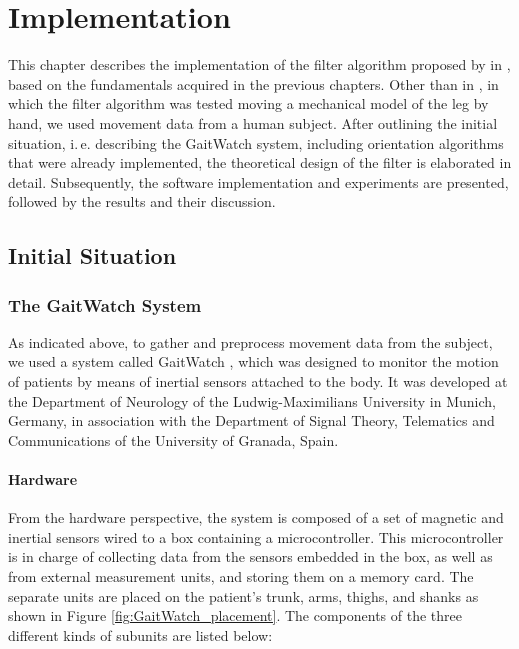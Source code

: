 \chapter{Implementation}
\label{ch:Implementation}

This chapter describes the implementation of the filter algorithm proposed by \citeauthor{bennett_motion_2014} in \cite{bennett_motion_2014}, based on the fundamentals acquired in the previous chapters. Other than in \cite{bennett_motion_2014}, in which the filter algorithm was tested moving a mechanical model of the leg by hand, we used movement data from a human subject. After outlining the initial situation, i.\,e. \mbox{describing} the GaitWatch system, including orientation algorithms that were already implemented, the theoretical design of the filter is elaborated in detail. Subsequently, the software implementation and experiments are presented, followed by the results and their discussion.

\section{Initial Situation}\label{sec:initial_situation}

\subsection{The GaitWatch System}

As indicated above, to gather and preprocess movement data from the subject, we used a system called GaitWatch \cite{olivares_vicente_gaitwatch_2013}, which was designed to monitor the motion of patients by means of inertial sensors attached to the body. It was developed at the Department of Neurology of the Ludwig-Maximilians University in Munich, Germany, in association with the Department of Signal Theory, Telematics and Communications of the University of Granada, Spain.

\subsubsection{Hardware}

From the hardware perspective, the system is composed of a set of magnetic and inertial sensors wired to a box containing a microcontroller. This microcontroller is in charge of collecting data from the sensors embedded in the box, as well as from  external measurement units, and storing them on a memory card. The separate units are placed on the patient's trunk, arms, thighs, and shanks as shown in Figure \ref{fig:GaitWatch_placement}. The components of the three different kinds of subunits are listed below:

